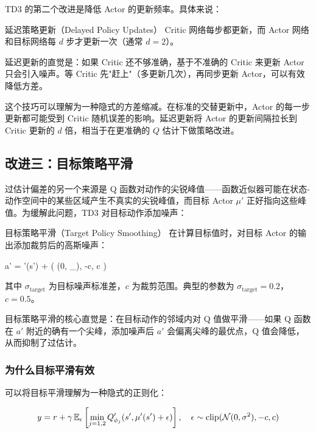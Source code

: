 TD3 的第二个改进是降低 Actor 的更新频率。具体来说：

\begin{mydefinition}{延迟策略更新（Delayed Policy Updates）}
Critic 网络每步都更新，而 Actor 网络和目标网络每 $d$ 步才更新一次（通常 $d = 2$）。
\end{mydefinition}

延迟更新的直觉是：如果 Critic 还不够准确，基于不准确的 Critic 来更新 Actor 只会引入噪声。等 Critic 先"赶上"（多更新几次），再同步更新 Actor，可以有效降低方差。

\begin{remark}
这个技巧可以理解为一种隐式的方差缩减。在标准的交替更新中，Actor 的每一步更新都可能受到 Critic 随机误差的影响。延迟更新将 Actor 的更新间隔拉长到 Critic 更新的 $d$ 倍，相当于在更准确的 $Q$ 估计下做策略改进。
\end{remark}

\subsection{改进三：目标策略平滑}

过估计偏差的另一个来源是 Q 函数对动作的尖锐峰值——函数近似器可能在状态-动作空间中的某些区域产生不真实的尖锐峰值，而目标 Actor $\mu'$ 正好指向这些峰值。为缓解此问题，TD3 对目标动作添加噪声：

\begin{mydefinition}{目标策略平滑（Target Policy Smoothing）}
在计算目标值时，对目标 Actor 的输出添加裁剪后的高斯噪声：

\begin{myformula}
a' = \mu'(s') + \big( (0, \sigma_{}),\; -c,\; c \big)
\end{myformula}

其中 $\sigma_{\text{target}}$ 为目标噪声标准差，$c$ 为裁剪范围。典型的参数为 $\sigma_{\text{target}} = 0.2$，$c = 0.5$。
\end{mydefinition}

目标策略平滑的核心直觉是：在目标动作的邻域内对 Q 值做平滑——如果 Q 函数在 $a'$ 附近的确有一个尖峰，添加噪声后 $a'$ 会偏离尖峰的最优点，Q 值会降低，从而抑制了过估计。

\subsubsection{为什么目标平滑有效}

可以将目标平滑理解为一种隐式的正则化：

\[
y = r + \gamma \, \mathbb{E}_{\epsilon} \left[ \min_{j=1,2} Q'_{\phi_j}(s', \mu'(s') + \epsilon) \right], \quad \epsilon \sim \operatorname{clip}(\mathcal{N}(0, \sigma^2), -c, c)
\]

